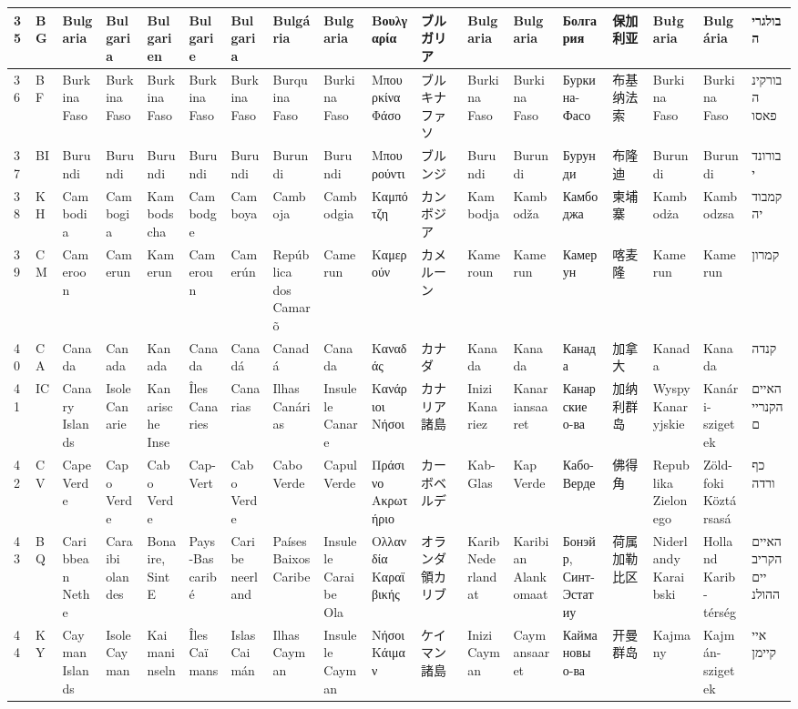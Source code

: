 \begin{longtable}{|l|l|l|l|l|l|l|l|l|l|l|l|l|l|l|l|l|l|}
35 & BG & Bulgaria & Bulgaria & Bulgarien & Bulgarie & Bulgaria & Bulgária & Bulgaria & Βουλγαρία & ブルガリア & Bulgaria & Bulgaria & Болгария & 保加利亚 & Bułgaria & Bulgária & בולגריה \\ \hline 
36 & BF & Burkina Faso & Burkina Faso & Burkina Faso & Burkina Faso & Burkina Faso & Burquina Faso & Burkina Faso & Μπουρκίνα Φάσο & ブルキナファソ & Burkina Faso & Burkina Faso & Буркина-Фасо & 布基纳法索 & Burkina Faso & Burkina Faso & בורקינה פאסו \\ \hline 
37 & BI & Burundi & Burundi & Burundi & Burundi & Burundi & Burundi & Burundi & Μπουρούντι & ブルンジ & Burundi & Burundi & Бурунди & 布隆迪 & Burundi & Burundi & בורונדי \\ \hline 
38 & KH & Cambodia & Cambogia & Kambodscha & Cambodge & Camboya & Camboja & Cambodgia & Καμπότζη & カンボジア & Kambodja & Kambodža & Камбоджа & 柬埔寨 & Kambodża & Kambodzsa & קמבודיה \\ \hline 
39 & CM & Cameroon & Camerun & Kamerun & Cameroun & Camerún & República dos Camarõ & Camerun & Καμερούν & カメルーン & Kameroun & Kamerun & Камерун & 喀麦隆 & Kamerun & Kamerun & קמרון \\ \hline 
40 & CA & Canada & Canada & Kanada & Canada & Canadá & Canadá & Canada & Καναδάς & カナダ & Kanada & Kanada & Канада & 加拿大 & Kanada & Kanada & קנדה \\ \hline 
41 & IC & Canary Islands & Isole Canarie & Kanarische Inse & Îles Canaries & Canarias & Ilhas Canárias & Insulele Canare & Κανάριοι Νήσοι & カナリア諸島 & Inizi Kanariez & Kanariansaaret & Канарские о-ва & 加纳利群岛 & Wyspy Kanaryjskie & Kanári-szigetek & האיים הקנריים \\ \hline 
42 & CV & Cape Verde & Capo Verde & Cabo Verde & Cap-Vert & Cabo Verde & Cabo Verde & Capul Verde & Πράσινο Ακρωτήριο & カーボベルデ & Kab-Glas & Kap Verde & Кабо-Верде & 佛得角 & Republika Zielonego  & Zöld-foki Köztársasá & כף ורדה \\ \hline 
43 & BQ & Caribbean Nethe & Caraibi olandes & Bonaire, Sint E & Pays-Bas caribé & Caribe neerland & Países Baixos Caribe & Insulele Caraibe Ola & Ολλανδία Καραϊβικής & オランダ領カリブ & Karib Nederlandat & Karibian Alankomaat & Бонэйр, Синт-Эстатиу & 荷属加勒比区 & Niderlandy Karaibski & Holland Karib-térség & האיים הקריביים ההולנ \\ \hline 
44 & KY & Cayman Islands & Isole Cayman & Kaimaninseln & Îles Caïmans & Islas Caimán & Ilhas Cayman & Insulele Cayman & Νήσοι Κάιμαν & ケイマン諸島 & Inizi Cayman & Caymansaaret & Каймановы о-ва & 开曼群岛 & Kajmany & Kajmán-szigetek & איי קיימן \\ \hline 

\end{longtable}
